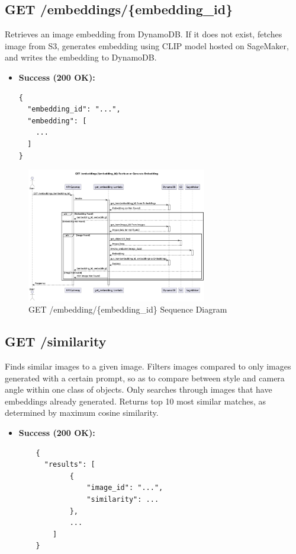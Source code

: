 \documentclass{article}
\begin{document}
\subsection{GET /embeddings/\{embedding\_id\}}
Retrieves an image embedding from DynamoDB. If it does not exist, fetches image from S3, generates embedding using CLIP model hosted on SageMaker, and writes the embedding to DynamoDB.

\begin{itemize}[noitemsep,topsep=0pt,parsep=0pt,partopsep=0pt]
    \item \textbf{Success (200 OK):}
         \begin{lstlisting}
{
  "embedding_id": "...",
  "embedding": [
    ...
  ]
}
\end{lstlisting}
\end{itemize}

\begin{figure}[h!]
    \centering
    \includegraphics[width=0.7\textwidth]{uml/get_embedding.png}%
    \caption{GET /embedding/\{embedding\_id\} Sequence Diagram}
\end{figure}

\subsection{GET /similarity}
Finds similar images to a given image. Filters images compared to only images generated with a certain prompt, so as to compare between style and camera angle within one class of objects. Only searches through images that have embeddings already generated. Returns top 10 most similar matches, as determined by maximum cosine similarity.

\begin{itemize}[noitemsep,topsep=0pt,parsep=0pt,partopsep=0pt]

    \item \textbf{Success (200 OK):}
    \begin{samepage}
    \begin{lstlisting}
    {
      "results": [
            {
                "image_id": "...",
                "similarity": ...
            },
            ...
        ]
    }
    \end{lstlisting}
    \end{samepage}
\end{itemize}
\end{document}
